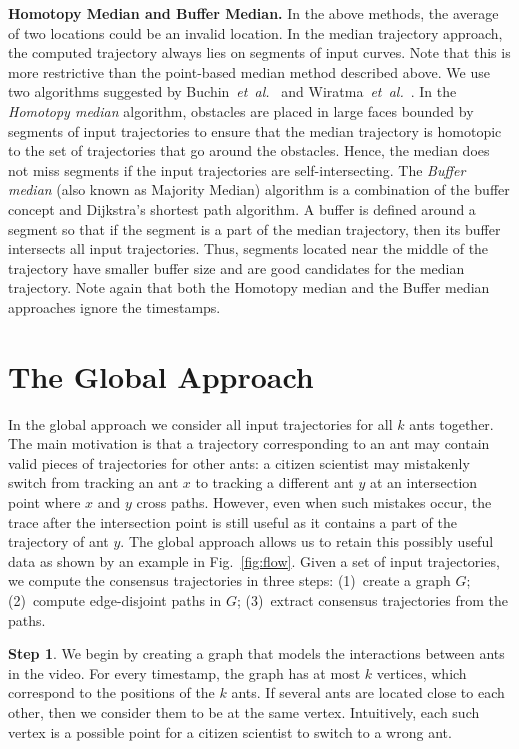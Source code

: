\documentclass[runningheads]{llncs}
\begin{document}
{\bf Homotopy Median and Buffer Median.}
In the above methods, the average of two locations could be an
invalid location.
In the median trajectory approach, the computed trajectory always
lies on segments of input curves.
Note that this is more restrictive than the point-based median method described above.
We use two algorithms suggested by Buchin~{\em et~al.}~\cite{bbklsww-mt-10} and
Wiratma~{\em et~al.}~\cite{vanKre11}.
In the \emph{Homotopy median} algorithm, obstacles are placed in
large faces bounded by segments
of input trajectories to ensure that the median
trajectory is homotopic to the set of trajectories that go around
the obstacles. Hence, the median does not miss segments if the input
trajectories are self-intersecting.
The \emph{Buffer median} (also known as Majority Median) algorithm is a combination of the buffer
concept and Dijkstra's shortest path algorithm. A buffer is defined around a
segment so that if the segment is a part of the
median trajectory, then its buffer intersects all input trajectories. Thus,
segments located near the middle of the trajectory have smaller
buffer size and are good candidates for the median
trajectory. Note again that both the Homotopy median and the Buffer median approaches ignore the
timestamps.

\section{The Global Approach}
\label{sect:global}

In the global approach we consider all input trajectories for all $k$
ants together. The main motivation is that a trajectory corresponding
to an ant may contain valid pieces of trajectories for other ants:
a citizen scientist may mistakenly switch from tracking
an ant $x$ to tracking a different ant $y$ at an intersection point where
$x$ and $y$ cross paths. However, even when such mistakes occur, the
trace after the intersection point is still useful as it contains a
part of the trajectory of ant $y$. The global approach allows us to
retain this possibly useful data as shown by an example in
Fig.~\ref{fig:flow}.
Given a set of input trajectories, we compute the consensus
trajectories in three steps: (1)~create a graph $G$; (2)~compute edge-disjoint
paths in $G$; (3)~extract consensus trajectories from the paths.

{\bf Step 1}. We begin by creating a graph that
models the interactions between ants in the video. For every timestamp,
the graph has at most $k$ vertices, which correspond to the
positions of the $k$ ants. If several ants are located close to each
other, then
we consider them to be at the same vertex. Intuitively, each such vertex is
a possible point for a citizen scientist to switch to a wrong ant.
\end{document}
